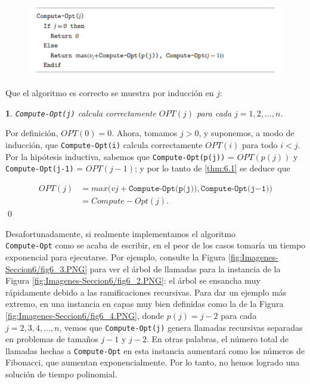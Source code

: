 \documentclass[a4paper, 12pt]{book}
\theoremstyle{dotless}
\newtheorem{theorem}{}[section]
\renewenvironment{proof}{\vspace{12pt}{\noindent\bfseries Demostración.}}{\qed\vspace{12pt}}
\begin{document}
\begin{figure}[h]
\centering
\includegraphics[scale=1.2]{Imagenes-Seccion6/cod6_1.PNG}
\end{figure}

Que el algoritmo es correcto se muestra por inducción en $j$:

\noindent\colorbox{mygray}{\parbox{\textwidth}{
\begin{theorem}
\texttt{Compute-Opt(j)} calcula correctamente $OPT(j)$ para cada $j = 1, 2,\dots,n.$
\end{theorem}
}}

\begin{proof}
Por definición, $OPT(0) = 0$. Ahora, tomamos $j>0$, y suponemos, a modo de inducción, que \texttt{Compute-Opt(i)} calcula correctamente $OPT(i)$ para todo $i<j$. Por la hipótesis inductiva, sabemos que \texttt{Compute-Opt(p(j))} = $OPT(p(j))$ y \texttt{Compute-Opt(j-1)} = $OPT(j-1)$; y por lo tanto de \ref{thm:6.1} se deduce que

\begin{equation*}
\begin{split}
OPT(j) & = max(vj + \texttt{Compute-Opt(p(j))}, \texttt{Compute-Opt(j−1))}\\ 
 & = Compute-Opt(j).
\end{split}
\end{equation*}
\end{proof}


Desafortunadamente, si realmente implementamos el algoritmo\\ \texttt{Compute-Opt} como se acaba de escribir, en el peor de los casos tomaría un tiempo exponencial para ejecutarse. 
Por ejemplo, consulte la Figura \ref{fig:Imagenes-Seccion6/fig6_3.PNG} para ver el árbol de llamadas para la instancia de la Figura \ref{fig:Imagenes-Seccion6/fig6_2.PNG}: el árbol se ensancha muy rápidamente debido a las ramificaciones recursivas. 
Para dar un ejemplo más extremo, en una instancia en capas muy bien definidas como la de la Figura \ref{fig:Imagenes-Seccion6/fig6_4.PNG}, donde $p(j) = j-2$ para cada $j = 2,3,4,\dots,n$, vemos que \texttt{Compute-Opt(j)} genera llamadas recursivas separadas en problemas de tamaños $j - 1$ y $j - 2$. En otras palabras, el número total de llamadas hechas a \texttt{Compute-Opt} en esta instancia aumentará como los números de Fibonacci, que aumentan exponencialmente. Por lo tanto, no hemos logrado una solución de tiempo polinomial.
\end{document}
